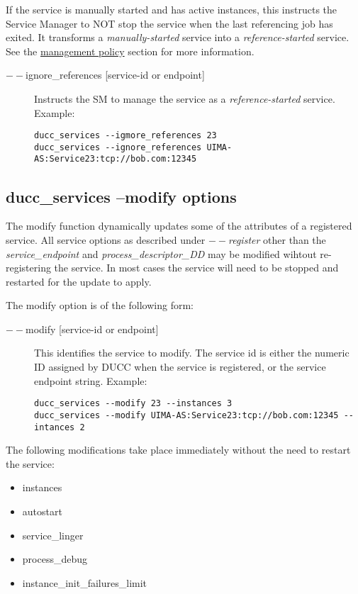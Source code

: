     If the service is manually started and has active instances, this instructs the Service Manager
    to NOT stop the service when the last referencing job has exited.  It transforms a {\em manually-started}
    service into a {\em reference-started} service. See the \hyperref[sec:service.management-policy]{management policy} section for
    more information. 
       \begin{description}
       \item[$--$ignore\_references {[service-id or endpoint]}] Instructs the SM to manage the
         service as a {\em reference-started} service. Example:
\begin{verbatim}
ducc_services --igmore_references 23 
ducc_services --ignore_references UIMA-AS:Service23:tcp://bob.com:12345 
\end{verbatim}
         
       \end{description}


    \subsection{ducc\_services --modify options}
    The modify function dynamically updates some of the attributes of a registered service.  All
    service options as described under {\em $--$register} other than the {\em service\_endpoint} 
    and {\em process\_descriptor\_DD} may be modified wihtout re-registering the service.  In most cases the
    service will need to be stopped and restarted for the update to apply. 
    
    The modify option is of the following form:
    \begin{description}

        \item[$--$modify {[service-id or endpoint]}]  This identifies the service to modify. The service id is either
          the numeric ID assigned by DUCC when the service is registered, or the service endpoint
          string.  Example:
\begin{verbatim}
ducc_services --modify 23 --instances 3 
ducc_services --modify UIMA-AS:Service23:tcp://bob.com:12345 --intances 2 
\end{verbatim}    
    \end{description}

    The following modifications take place immediately without the need to restart the service:
    \begin{itemize}
      \item instances
      \item autostart
      \item service\_linger
      \item process\_debug
      \item instance\_init\_failures\_limit
    \end{itemize}
      
